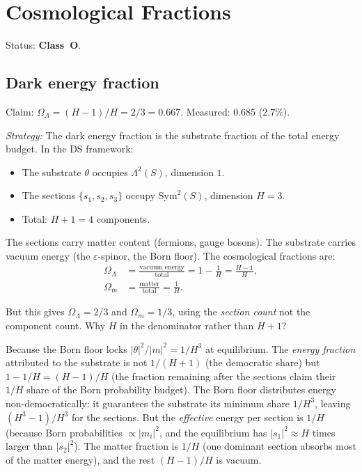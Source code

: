\documentclass[11pt,a4paper]{article}
\theoremstyle{definition}
\theoremstyle{remark}
\newcommand{\Sym}{\mathrm{Sym}}
\begin{document}
\section{Cosmological Fractions}\label{sec:cosmo}

Status: \textbf{Class~O}.

\subsection{Dark energy fraction}\label{sec:omega_lambda}

Claim: $\Omega_\Lambda = (H-1)/H = 2/3 = 0.667$. Measured: $0.685$ ($2.7\%$).

\emph{Strategy:} The dark energy fraction is the substrate fraction of the total energy budget. In the DS framework:
\begin{itemize}[nosep]
\item The substrate $\theta$ occupies $\Lambda^2(S)$, dimension $1$.
\item The sections $\{s_1, s_2, s_3\}$ occupy $\Sym^2(S)$, dimension $H = 3$.
\item Total: $H + 1 = 4$ components.
\end{itemize}

The sections carry matter content (fermions, gauge bosons). The substrate carries vacuum energy (the $\varepsilon$-spinor, the Born floor). The cosmological fractions are:
\begin{align}
\Omega_\Lambda &= \frac{\text{vacuum energy}}{\text{total}} = 1 - \frac{1}{H} = \frac{H-1}{H}, \\
\Omega_m &= \frac{\text{matter}}{\text{total}} = \frac{1}{H}.
\end{align}

But this gives $\Omega_\Lambda = 2/3$ and $\Omega_m = 1/3$, using the \emph{section count} not the component count. Why $H$ in the denominator rather than $H+1$?

Because the Born floor locks $|\theta|^2/|m|^2 = 1/H^3$ at equilibrium. The \emph{energy fraction} attributed to the substrate is not $1/(H+1)$ (the democratic share) but $1 - 1/H = (H-1)/H$ (the fraction remaining after the sections claim their $1/H$ share of the Born probability budget). The Born floor distributes energy non-democratically: it guarantees the substrate its minimum share $1/H^3$, leaving $(H^3-1)/H^3$ for the sections. But the \emph{effective} energy per section is $1/H$ (because Born probabilities $\propto |m_i|^2$, and the equilibrium has $|s_1|^2 \approx H$ times larger than $|s_2|^2$). The matter fraction is $1/H$ (one dominant section absorbs most of the matter energy), and the rest $(H-1)/H$ is vacuum.
\end{document}
